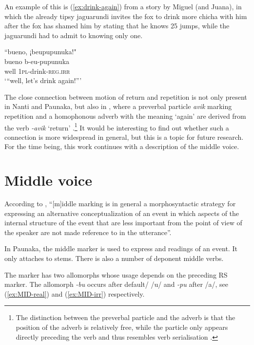 An example of this is (\ref{ex:drink-again}) from a story by Miguel (and Juana), in which the already tipsy jaguarundi invites the fox to drink more chicha with him after the fox has shamed him by stating that he knows 25 jumps, while the jaguarundi had to admit to knowing only one.

\ea\label{ex:drink-again}
\begingl 
\glpreamble “bueno, ¡beupupunuka!"\\
\gla bueno b-eu-pupunuka\\ 
\glb well 1\textsc{pl}-drink-\textsc{reg.irr}\\ 
\glft ‘“well, let’s drink again!”’
\trailingcitation{[jmx-n120429ls-x5.371]}
\xe

The close connection between motion of return and repetition is not only present in Nanti and Paunaka, but also in , where a preverbal particle \textit{avik} marking repetition and a homophonous adverb with the meaning ‘again’ are derived from the verb \textit{-avik} ‘return’ \citep[283]{Danielsen2007}.\footnote{The distinction between the preverbal particle and the adverb is that the position of the adverb is relatively free, while the particle only appears directly preceding the verb and thus resembles verb serialisation \citep[283]{Danielsen2007}.} It would be interesting to find out whether such a connection is more widespread in general, but this is a topic for future research. For the time being, this work continues with a description of the middle voice.


\section{Middle voice}\label{sec:Middle_voice}

According to \citet[243]{Kemmer1993}, “[m]iddle marking is in general a morphosyntactic strategy for expressing an alternative conceptualization of an event in which aspects of the internal structure of the event that are less important from the point of view of the speaker are not made reference to in the utterance”.

In Paunaka, the middle marker is used to express  and  readings of an event. It only attaches to  stems. There is also a number of deponent middle verbs.

The marker has two allomorphs whose usage depends on the preceding RS marker. The allomorph \textit{-bu} occurs after default/ /u/ and \textit{-pu} after  /a/, see (\ref{ex:MID-real}) and (\ref{ex:MID-irr}) respectively.

